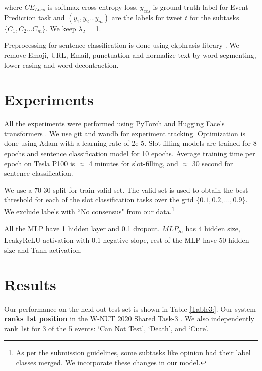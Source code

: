 \documentclass[11pt,a4paper]{article}
\begin{document}
where $CE_{Loss}$ is softmax cross entropy loss,  $y_{ces}$ is ground truth label for Event-Prediction task and $(y_1, y_2 ... y_m)$ are the labels for tweet $t$ for the subtasks $\{C_1, C_2 ... C_m\}$. We keep $\lambda_2$ = 1.

Preprocessing for sentence classification is done using ekphrasis library \cite{baziotis-pelekis-doulkeridis:2017:SemEval2}. We remove Emoji, URL, Email, punctuation and normalize text by word segmenting, lower-casing and word decontraction.


\section{Experiments}\label{experiments_section}

All the experiments were performed using PyTorch \cite{pytorch} and Hugging Face's transformers \cite{huggingface}. We use git and wandb \cite{wandb} for experiment tracking. Optimization is done using Adam \cite{kingma2014adam} with a learning rate of 2e-5. Slot-filling models are trained for 8 epochs and sentence classification model for 10 epochs. Average training time per epoch on Tesla P100 is $\approx$ 4 minutes for slot-filling, and $\approx$ 30 second for sentence classification.

We use a 70-30 split for train-valid set. The valid set is used to obtain the best threshold for each of the slot classification tasks over the grid $\{0.1, 0.2, ..., 0.9\}$. We exclude labels with ``No consensus" from our data.\footnote{As per the submission guidelines, some subtasks like opinion had their label classes merged. We incorporate these changes in our model.}

All the MLP have 1 hidden layer and 0.1 dropout. $MLP_{S_j}$ has 4 hidden size, LeakyReLU activation \cite{Maas13rectifiernonlinearities} with 0.1 negative slope, rest of the MLP have 50 hidden size and Tanh activation.



\section{Results}

Our performance on the held-out test set is shown in Table \ref{Table3:}. Our system \textbf{ranks 1st position} in the W-NUT 2020 Shared Task-3 \cite{zong2020extracting}. We also independently rank 1st for 3 of the 5 events: `Can Not Test', `Death', and `Cure'.
\end{document}
